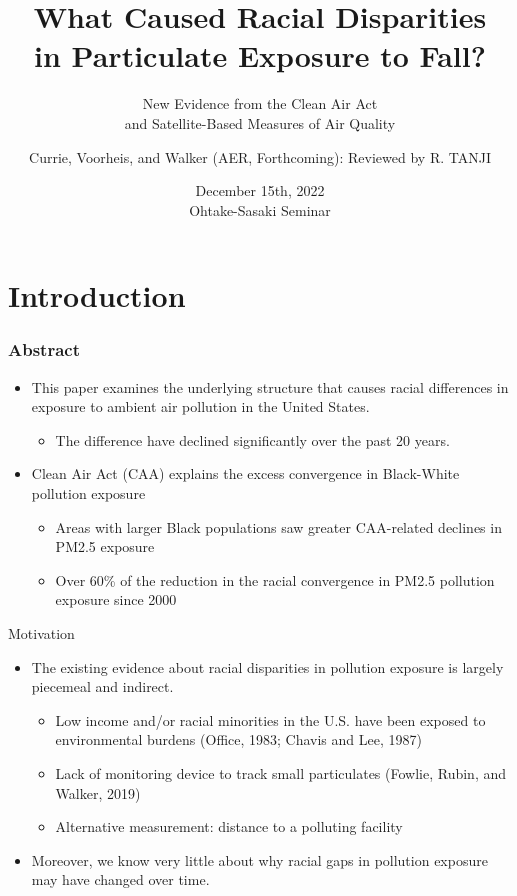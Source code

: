 \documentclass[dvipdfmx,12pt]{beamer}
\title[Currie, Voorheis, and Walker, Forthcoming]{What Caused Racial Disparities \\ in Particulate Exposure to Fall?}
\subtitle{New Evidence from the Clean Air Act \\ and Satellite-Based Measures of Air Quality}
\author[R.Tanji]{Currie, Voorheis, and Walker (AER, Forthcoming): Reviewed by R. TANJI}
\date[12/15/2022 OS Semi.]{December 15th, 2022 \\ Ohtake-Sasaki Seminar}
\institute[]{Osaka University, Graduate School of Economics}
\begin{document}
\begin{frame}\frametitle{}
\titlepage
\end{frame}

\section{Introduction}

\begin{frame}\frametitle{Abstract}
  \begin{itemize}
    \item This paper examines the underlying structure that causes racial differences in exposure to ambient air pollution in the United States.
    \begin{itemize}
      \item The difference have declined significantly over the past 20 years.
    \end{itemize}
    \item Clean Air Act (CAA) explains the excess convergence in Black-White pollution exposure
    \begin{itemize}
      \item Areas with larger Black populations saw greater CAA-related declines in PM2.5 exposure
      \item Over 60\% of the reduction in the racial convergence in PM2.5 pollution exposure since 2000
    \end{itemize}
  \end{itemize}
\end{frame}

\frame{\tableofcontents}

\frame{\sectionpage}
\begin{frame}{Motivation}
  \begin{itemize}
    \item The existing evidence about racial disparities in pollution exposure is largely piecemeal and indirect.
    \begin{itemize}
      \item Low income and/or racial minorities in the U.S. have been exposed to environmental burdens (Office, 1983; Chavis and Lee, 1987)
      \item Lack of monitoring device to track small particulates (Fowlie, Rubin, and Walker, 2019)
      \item Alternative measurement: distance to a polluting facility
    \end{itemize}
    \item Moreover, we know very little about why racial gaps in pollution exposure may have changed over time.
  \end{itemize}
\end{frame}
\end{document}
